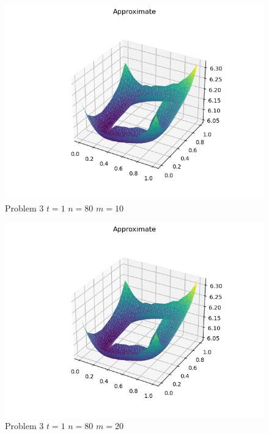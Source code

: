 \documentclass{report}
\begin{document}
\begin{figure}[h]
	\caption{Problem 3 $t = 1$ $n = 80$ $m = 10$}
	\includegraphics[width=\textwidth]{example.png}
\end{figure}
\begin{figure}[h]
	\caption{Problem 3 $t = 1$ $n = 80$ $m = 20$}
	\includegraphics[width=\textwidth]{example.png}
\end{figure}
\end{document}

